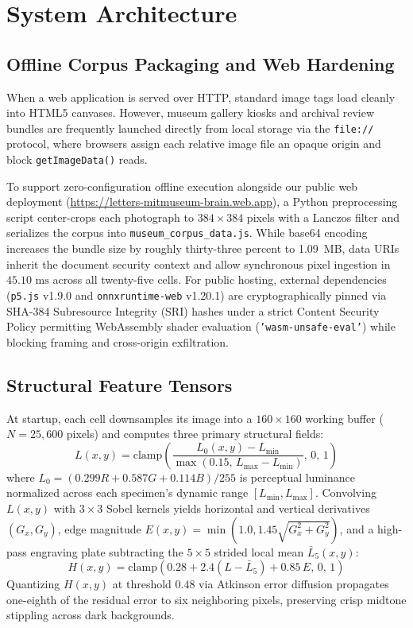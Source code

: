 \documentclass[journal,compsoc]{IEEEtran}
\begin{document}
\section{System Architecture}

\subsection{Offline Corpus Packaging and Web Hardening}
When a web application is served over HTTP, standard image tags load cleanly into HTML5 canvases. However, museum gallery kiosks and archival review bundles are frequently launched directly from local storage via the \texttt{file://} protocol, where browsers assign each relative image file an opaque origin and block \texttt{getImageData()} reads.

To support zero-configuration offline execution alongside our public web deployment (\url{https://letters-mitmuseum-brain.web.app}), a Python preprocessing script center-crops each photograph to $384\times 384$ pixels with a Lanczos filter and serializes the corpus into \texttt{museum\_corpus\_data.js}. While base64 encoding increases the bundle size by roughly thirty-three percent to 1.09~MB, data URIs inherit the document security context and allow synchronous pixel ingestion in $45.10\text{ ms}$ across all twenty-five cells. For public hosting, external dependencies (\texttt{p5.js} v1.9.0 and \texttt{onnxruntime-web} v1.20.1) are cryptographically pinned via SHA-384 Subresource Integrity (SRI) hashes under a strict Content Security Policy permitting WebAssembly shader evaluation (\texttt{'wasm-unsafe-eval'}) while blocking framing and cross-origin exfiltration.

\subsection{Structural Feature Tensors}
At startup, each cell downsamples its image into a $160\times 160$ working buffer ($N = 25{,}600$ pixels) and computes three primary structural fields:
\begin{equation}
L(x,y) = \text{clamp}\!\left(\frac{L_0(x,y) - L_{\min}}{\max(0.15,\, L_{\max} - L_{\min})},\, 0,\, 1\right)
\end{equation}
where $L_0 = (0.299R + 0.587G + 0.114B)/255$ is perceptual luminance normalized across each specimen's dynamic range $[L_{\min}, L_{\max}]$. Convolving $L(x,y)$ with $3\times 3$ Sobel kernels yields horizontal and vertical derivatives $(G_x, G_y)$, edge magnitude $E(x,y) = \min(1.0, 1.45\sqrt{G_x^2 + G_y^2})$, and a high-pass engraving plate subtracting the $5\times 5$ strided local mean $\bar{L}_5(x,y)$:
\begin{equation}
H(x,y) = \text{clamp}\!\left(0.28 + 2.4(L - \bar{L}_5) + 0.85\,E,\, 0,\, 1\right)
\end{equation}
Quantizing $H(x,y)$ at threshold $0.48$ via Atkinson error diffusion propagates one-eighth of the residual error to six neighboring pixels, preserving crisp midtone stippling across dark backgrounds.
\end{document}
